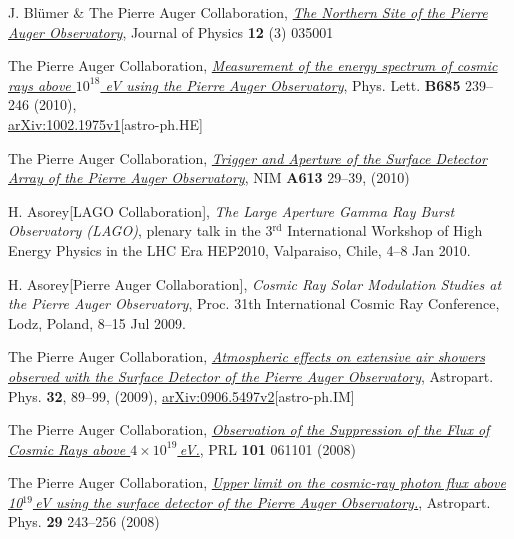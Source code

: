 \begin{etaremune}
\item {}J. Bl\"umer \& The Pierre Auger Collaboration,
\href{http://dx.doi.org/10.1088/1367-2630/12/3/035001}{\emph{The Northern Site
of the Pierre Auger Observatory}}, Journal of Physics {\bf 12} (3) 035001

\item {}The Pierre Auger Collaboration,
\href{http://dx.doi.org/10.1016/j.physletb.2010.02.013}{\emph{Measurement of
the energy spectrum of cosmic rays above $10^{18}$ eV using the Pierre Auger
Observatory}}, Phys. Lett. {\bf B685} 239--246 (2010),\\
\href{http://arxiv.org/abs/1002.1975}{arXiv:1002.1975v1}[astro-ph.HE]

\item {}The Pierre Auger Collaboration,
\href{http://dx.doi.org/10.1016/j.nima.2009.11.018}{\emph{Trigger and Aperture
of the Surface Detector Array of the Pierre Auger Observatory}}, NIM {\bf A613}
29--39, (2010)

\item {}H. Asorey[LAGO Collaboration], {\emph{The Large Aperture Gamma Ray
Burst Observatory (LAGO)}}, plenary talk in the 3$^{\mathrm{rd}}$ International Workshop of
High Energy Physics in the LHC Era HEP2010, Valparaiso, Chile, 4--8 Jan 2010.

\item {}H. Asorey[Pierre Auger Collaboration], {\emph{Cosmic Ray Solar
Modulation Studies at the Pierre Auger Observatory}}, \en Proc. 31th
International Cosmic Ray Conference, Lodz, Poland, 8--15 Jul 2009.

\item {} The Pierre Auger Collaboration,
\href{http://dx.doi.org/10.1016/j.astropartphys.2009.06.004}{\emph{Atmospheric
effects on extensive air showers observed with the Surface Detector of the
Pierre Auger Observatory}}, Astropart. Phys. {\bf 32}, 89--99, (2009),
\href{http://arxiv.org/abs/0906.5497/}{arXiv:0906.5497v2}[astro-ph.IM]

\item {}The Pierre Auger Collaboration,
\href{http://dx.doi.org/10.1103/PhysRevLett.101.061101}{\emph{Observation of
the Suppression of the Flux of Cosmic Rays above $4\times10^{19}$\,eV.}}, PRL
{\bf 101} 061101 (2008)

\item {}The Pierre Auger Collaboration,
\href{http://dx.doi.org/10.1016/j.astropartphys.2008.01.003}{\emph{Upper limit
on the cosmic-ray photon flux above 10$^{19}$\,eV using the surface detector of
the Pierre Auger Observatory.}}, Astropart. Phys. {\bf 29} 243--256 (2008)


\end{etaremune}
